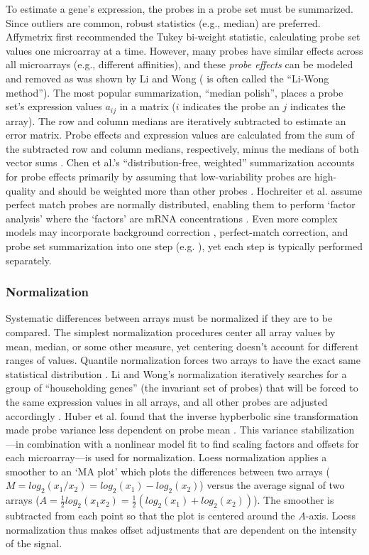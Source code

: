 To estimate a gene's expression, the probes in a probe
set must be summarized. 
Since outliers are common, robust
statistics (e.g., median) are preferred.
Affymetrix first recommended the Tukey bi-weight
statistic, calculating probe set values one microarray at a time.
However, many probes have similar effects across all microarrays
(e.g., different affinities), and these \textit{probe effects} can 
be modeled and removed as was shown by Li and Wong 
(\cite{Li:2001jv,Li:2001wk} is often called the ``Li-Wong method'').
The most popular summarization, ``median polish'', places a probe set's expression
values $a_{ij}$ in a matrix ($i$ indicates the probe an $j$ 
indicates the array). The row and column medians are 
iteratively subtracted to estimate an error matrix. Probe effects and
expression values are calculated from the sum of the subtracted row 
and column medians, respectively, minus the 
medians of both vector sums \cite{Mosteller:1977vp,Irizarry:2003ge}.  
Chen et al.'s ``distribution-free, weighted'' summarization
accounts for probe effects primarily by assuming that low-variability
probes are high-quality and should be weighted more 
than other probes \cite{Chen:2007cr}.
Hochreiter et al. assume perfect match probes are normally distributed, enabling
them to perform `factor analysis' 
where the `factors'
are mRNA concentrations \cite{Hochreiter:2006ja}. 
Even more complex models may incorporate 
background correction , perfect-match correction, and probe set summarization
into one step (e.g. \cite{Zhang:2003to,Liu:2005ey}), 
yet each step is typically performed separately.

\subsubsection{Normalization}

Systematic differences between arrays must be normalized if they
are to be compared. The simplest normalization procedures center
all array values by mean, median, or some other measure, yet centering
doesn't account for different ranges of values.
Quantile normalization forces two arrays to have the exact same
statistical distribution \cite{Bolstad:2003ia}. Li and Wong's normalization
iteratively searches for a group of ``householding genes'' (the invariant 
set of probes) that will be forced to the same expression values in all arrays,
and all other probes are adjusted accordingly \cite{Li:2001wk}.
Huber et al. found that the inverse hypberbolic sine transformation
made probe variance less dependent on probe mean \cite{Huber:2003bw}.
This variance stabilization---in combination with a nonlinear model fit to find
scaling factors and offsets for each microarray---is used for normalization.
Loess normalization applies a smoother to an `MA plot' which plots
the differences between two arrays ($M=log_2(x_1/x_2)=log_2(x_1)-log_2(x_2)$)
versus the average signal of two arrays ($A=\frac{1}{2}log_2(x_1x_2)=\frac{1}{2}(log_2(x_1)+log_2(x_2))$).
The smoother is subtracted from each point so that the plot
is centered around the $A$-axis. Loess normalization thus makes
offset adjustments that are dependent on the intensity of the signal.


